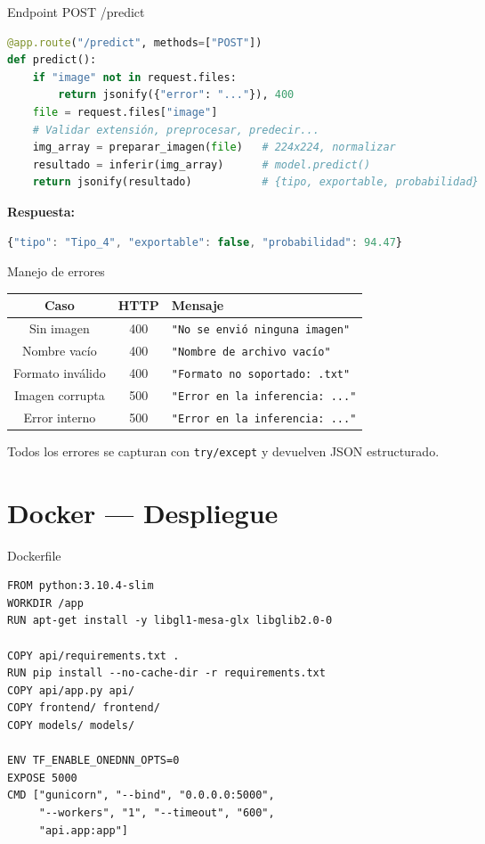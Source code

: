\documentclass[aspectratio=169]{beamer}
\begin{document}
\begin{frame}[fragile]{Endpoint POST /predict}
  \begin{lstlisting}[language=Python]
@app.route("/predict", methods=["POST"])
def predict():
    if "image" not in request.files:
        return jsonify({"error": "..."}), 400
    file = request.files["image"]
    # Validar extensión, preprocesar, predecir...
    img_array = preparar_imagen(file)   # 224x224, normalizar
    resultado = inferir(img_array)      # model.predict()
    return jsonify(resultado)           # {tipo, exportable, probabilidad}
  \end{lstlisting}

  \vspace{0.5em}
  \textbf{Respuesta:}
  \begin{lstlisting}[language=JavaScript]
{"tipo": "Tipo_4", "exportable": false, "probabilidad": 94.47}
  \end{lstlisting}
\end{frame}

\begin{frame}{Manejo de errores}
  \centering
  \begin{tabular}{|c|c|l|}
    \hline
    \textbf{Caso} & \textbf{HTTP} & \textbf{Mensaje} \\
    \hline
    Sin imagen & 400 & \texttt{"No se envió ninguna imagen"} \\
    Nombre vacío & 400 & \texttt{"Nombre de archivo vacío"} \\
    Formato inválido & 400 & \texttt{"Formato no soportado: .txt"} \\
    Imagen corrupta & 500 & \texttt{"Error en la inferencia: ..."} \\
    Error interno & 500 & \texttt{"Error en la inferencia: ..."} \\
    \hline
  \end{tabular}

  \vspace{1em}
  Todos los errores se capturan con \texttt{try/except} y devuelven JSON estructurado.
\end{frame}

\section{Docker — Despliegue}

\begin{frame}{Dockerfile}
  \begin{lstlisting}[language=Docker]
FROM python:3.10.4-slim
WORKDIR /app
RUN apt-get install -y libgl1-mesa-glx libglib2.0-0

COPY api/requirements.txt .
RUN pip install --no-cache-dir -r requirements.txt
COPY api/app.py api/
COPY frontend/ frontend/
COPY models/ models/

ENV TF_ENABLE_ONEDNN_OPTS=0
EXPOSE 5000
CMD ["gunicorn", "--bind", "0.0.0.0:5000",
     "--workers", "1", "--timeout", "600",
     "api.app:app"]
  \end{lstlisting}
\end{frame}
\end{document}
